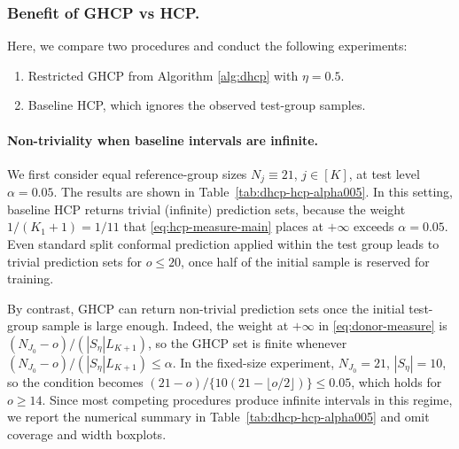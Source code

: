 \subsubsection{Benefit of GHCP vs HCP.}
Here, we compare two procedures and conduct the following experiments:

\begin{enumerate}[label=(\roman*)]
    \item Restricted GHCP from Algorithm \ref{alg:dhcp} with $\eta=0.5$.
    \item Baseline HCP, which ignores the observed test-group samples.
    
\end{enumerate} 

\paragraph{Non-triviality when baseline intervals are infinite.}
We first consider equal reference-group sizes $N_j\equiv 21$, $j\in[K]$, at test level $\alpha=0.05$. The results are shown in Table~\ref{tab:dhcp-hcp-alpha005}. In this setting, baseline HCP returns trivial (infinite) prediction sets, because the weight $1/(K_1+1)=1/11$ that \eqref{eq:hcp-measure-main} places at $+\infty$ exceeds $\alpha=0.05$. Even standard split conformal prediction applied within the test group leads to trivial prediction sets for $o\le 20$, once half of the initial sample is reserved for training.

By contrast, GHCP can return non-trivial prediction sets once the initial test-group sample is large enough. Indeed, the weight at $+\infty$ in \eqref{eq:donor-measure} is $(N_{J_0}-o)/(|S_\eta|L_{K+1})$, so the GHCP set is finite whenever $(N_{J_0}-o)/(|S_\eta|L_{K+1})\le\alpha$. In the fixed-size experiment, $N_{J_0}=21$, $|S_\eta|=10$, so the condition becomes $(21-o)/\{10(21-\lfloor o/2\rfloor)\}\le 0.05$, which holds for $o\ge 14$. Since most competing procedures produce infinite intervals in this regime, we report the numerical summary in Table~\ref{tab:dhcp-hcp-alpha005} and omit coverage and width boxplots.

